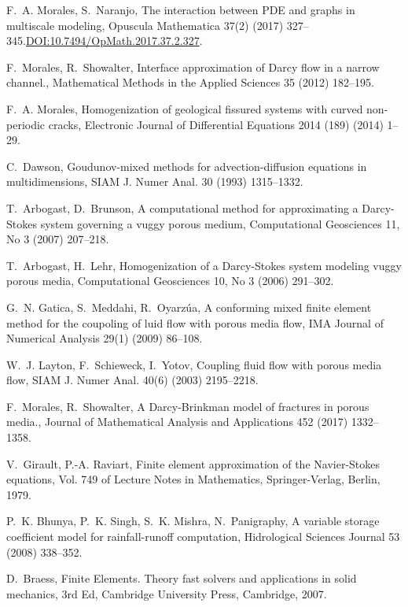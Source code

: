\documentclass[3p]{elsarticle}
\begin{document}
\begin{thebibliography}{10}
F.~A. Morales, S.~Naranjo, The interaction between {PDE} and graphs in
  multiscale modeling, Opuscula Mathematica 37(2) (2017)
  327--345.\url{DOI:10.7494/OpMath.2017.37.2.327}.

F.~Morales, R.~Showalter, Interface approximation of {D}arcy flow in a narrow
  channel., Mathematical Methods in the Applied Sciences 35 (2012) 182--195.

F.~A. Morales, Homogenization of geological fissured systems with curved
  non-periodic cracks, Electronic Journal of Differential Equations 2014 (189)
  (2014) 1--29.

C.~Dawson, Goudunov-mixed methods for advection-diffusion equations in
  multidimensions, SIAM J. Numer Anal. 30 (1993) 1315--1332.

T.~Arbogast, D.~Brunson, A computational method for approximating a
  {D}arcy-{S}tokes system governing a vuggy porous medium, Computational
  Geosciences 11, No 3 (2007) 207--218.

T.~Arbogast, H.~Lehr, Homogenization of a {D}arcy-{S}tokes system modeling
  vuggy porous media, Computational Geosciences 10, No 3 (2006) 291--302.

G.~N. Gatica, S.~Meddahi, R.~Oyarz{\'u}a, A conforming mixed finite element
  method for the coupoling of luid flow with porous media flow, IMA Journal of
  Numerical Analysis 29(1) (2009) 86--108.

W.~J. Layton, F.~Schieweck, I.~Yotov, Coupling fluid flow with porous media
  flow, SIAM J. Numer Anal. 40(6) (2003) 2195--2218.

F.~Morales, R.~Showalter, A {D}arcy-{B}rinkman model of fractures in porous
  media., Journal of Mathematical Analysis and Applications 452 (2017)
  1332--1358.

V.~Girault, P.-A. Raviart, Finite element approximation of the
  {N}avier-{S}tokes equations, Vol. 749 of Lecture Notes in Mathematics,
  Springer-Verlag, Berlin, 1979.

P.~K. Bhunya, P.~K. Singh, S.~K. Mishra, N.~Panigraphy, A variable storage
  coefficient model for rainfall-runoff computation, Hidrological Sciences
  Journal 53 (2008) 338--352.

D.~Braess, Finite Elements. Theory fast solvers and applications in solid
  mechanics, 3rd Ed, Cambridge University Press, Cambridge, 2007.


\end{thebibliography}
\end{document}
